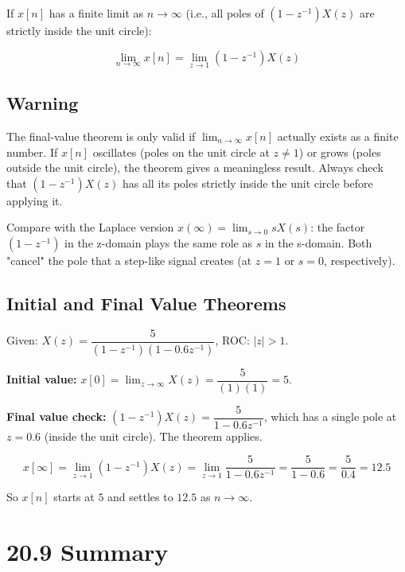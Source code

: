 \documentclass[11pt]{article}
\begin{document}
If $x[n]$ has a finite limit as $n \to \infty$ (i.e., all poles of $(1 - z^{-1}) X(z)$ are strictly inside the unit circle):

\[\lim_{n \to \infty} x[n] = \lim_{z \to 1} (1 - z^{-1}) X(z)\]

\subsection*{Warning}

The final-value theorem is only valid if $\lim_{n \to \infty} x[n]$ actually exists as a finite number. If $x[n]$ oscillates (poles on the unit circle at $z \neq 1$) or grows (poles outside the unit circle), the theorem gives a meaningless result. Always check that $(1 - z^{-1}) X(z)$ has all its poles strictly inside the unit circle before applying it.

Compare with the Laplace version $x(\infty) = \lim_{s \to 0} s X(s)$: the factor $(1 - z^{-1})$ in the z-domain plays the same role as $s$ in the s-domain. Both "cancel" the pole that a step-like signal creates (at $z = 1$ or $s = 0$, respectively).

\subsection*{Initial and Final Value Theorems}

Given: $X(z) = \dfrac{5}{(1 - z^{-1})(1 - 0.6 z^{-1})}$, ROC: $|z| > 1$.

\textbf{Initial value:} $x[0] = \lim_{z \to \infty} X(z) = \dfrac{5}{(1)(1)} = 5$.

\textbf{Final value check:} $(1 - z^{-1}) X(z) = \dfrac{5}{1 - 0.6 z^{-1}}$, which has a single pole at $z = 0.6$ (inside the unit circle). The theorem applies. \checkmark

\[x[\infty] = \lim_{z \to 1} (1 - z^{-1}) X(z) = \lim_{z \to 1} \frac{5}{1 - 0.6 z^{-1}} = \frac{5}{1 - 0.6} = \frac{5}{0.4} = 12.5\]

So $x[n]$ starts at $5$ and settles to $12.5$ as $n \to \infty$.

\section*{20.9 Summary}
\end{document}
